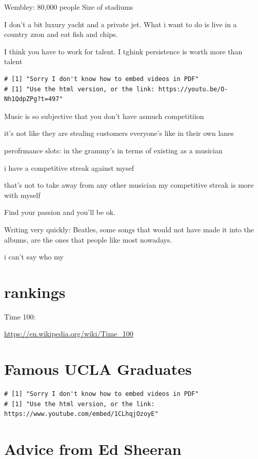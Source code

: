 \documentclass[]{book}
\theoremstyle{definition}
\theoremstyle{definition}
\theoremstyle{definition}
\theoremstyle{remark}
\begin{document}
Wembley: 80,000 people Size of stadiums

I don't a bit luxury yacht and a private jet. What i want to do is live
in a country zzon and eat fish and chips.

I think you have to work for talent. I tghink persistence is worth more
than talent

\begin{verbatim}
# [1] "Sorry I don't know how to embed videos in PDF"
# [1] "Use the html version, or the link: https://youtu.be/O-Nh1QdpZPg?t=497"
\end{verbatim}

Music is so subjective that you don't have asmuch competitiion

it's not like they are stealing customers everyone's like in their own
lanes

perofrmance slots: in the grammy's in terms of existing as a musician

i have a competitive streak against mysef

that's not to take away from any other musician my competitive streak is
more with myself

Find your passion and you'll be ok.

Writing very quickly: Beatles, some songs that would not have made it
into the albums, are the ones that people like most nowadays.

i can't say who my

\section{rankings}\label{rankings}

Time 100:

\url{https://en.wikipedia.org/wiki/Time_100}

\section{Famous UCLA Graduates}\label{famous-ucla-graduates}

\begin{verbatim}
# [1] "Sorry I don't know how to embed videos in PDF"
# [1] "Use the html version, or the link: https://www.youtube.com/embed/1CLhqjOzoyE"
\end{verbatim}

\section{Advice from Ed Sheeran}\label{advice-from-ed-sheeran}
\end{document}
